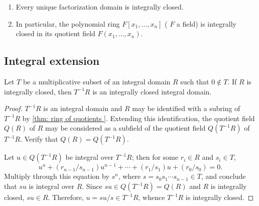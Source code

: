 \begin{proposition}
    \begin{enumerate}
        \item
              Every unique factorization domain is integrally closed.

        \item
              In particular, the polynomial ring $F\left[x_1, \ldots, x_n\right]$ ( $F$ a field) is integrally closed in its quotient field $F\left(x_1, \ldots, x_n\right)$.
    \end{enumerate}
\end{proposition}

\subsection{Integral extension}

\begin{theorem}
    Let $T$ be a multiplicative subset of an integral domain $R$ such that $0 \notin T$.
    If $R$ is integrally closed, then $T^{-1} R$ is an integrally closed integral domain.
    \begin{proof}
        $T^{-1} R$ is an integral domain and $R$ may be identified with a subring of $T^{-1} R$ by \ref{thm: ring of quotients }.
        Extending this identification, the quotient field $Q(R)$ of $R$ may be considered as a subfield of the quotient field $Q\left(T^{-1} R\right)$ of $T^{-1} R$. Verify that $Q(R)=Q\left(T^{-1} R\right)$.

        Let $u \in Q\left(T^{-1} R\right)$ be integral over $T^{-1} R$; then for some $r_i \in R$ and $s_i \in T$,
        \begin{equation*}
            u^n+\left(r_{n-1} / s_{n-1}\right) u^{n-1}+\cdots+\left(r_1 / s_1\right) u+\left(r_0 / s_0\right)=0 .
        \end{equation*}
        Multiply through this equation by $s^n$, where $s=s_0 s_1 \cdots s_{n-1} \in T$, and conclude that $su$ is integral over $R$. Since $s u \in Q\left(T^{-1} R\right)=Q(R)$ and $R$ is integrally closed, $s u \in R$. Therefore, $u=s u / s \in T^{-1} R$, whence $T^{-1} R$ is integrally closed.
    \end{proof}
\end{theorem}



